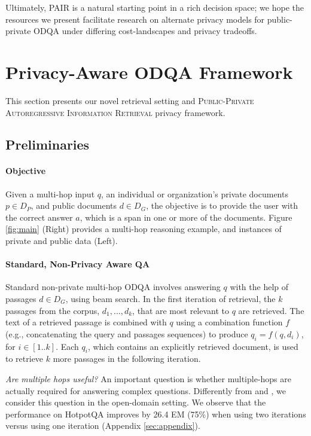 \documentclass{article}
\renewcommand\cite{\citep}	\newcommand\shortcite{\citeyearpar}\newcommand\newcite{\citet}
\newcommand{\problemlongname}{\textsc{Public-Private Autoregressive Information Retrieval}\xspace}
\newcommand{\problemshortname}{\textsc{PAIR}\xspace}
\begin{document}
Ultimately, \problemshortname is a natural starting point in a rich decision space; we hope the resources we present facilitate research on alternate privacy models for public-private ODQA under differing cost-landscapes and privacy tradeoffs. 
 
\section{Privacy-Aware ODQA Framework}
\label{sec:method}
This section presents our novel retrieval setting and \problemlongname privacy framework.

\subsection{Preliminaries}
\paragraph{Objective} Given a multi-hop input $q$, an individual or organization's private documents $p \in D_P$, and public documents $d \in D_G$, the objective is to provide the user with the correct answer $a$, which is a span in one or more of the documents. Figure \ref{fig:main} (Right) provides a multi-hop reasoning example, and instances of private and public data (Left).

\paragraph{Standard, Non-Privacy Aware QA} Standard non-private multi-hop ODQA involves answering $q$ with the help of passages $d \in D_G$, using beam search. In the first iteration of retrieval, the $k$ passages from the corpus, $d_1, ..., d_k$, that are most relevant to $q$ are retrieved. The text of a retrieved passage is combined with $q$ using a combination function $f$ (e.g., concatenating the query and passages sequences) to produce $q_i = f(q, d_i)$, for $i \in [1..k]$. Each $q_i$, which contains an explicitly retrieved document, is used to retrieve $k$ more passages in the following iteration. 


\textit{Are multiple hops useful?} An important question is whether multiple-hops are actually required for answering complex questions. Differently from \citet{min2019compmultihop} and \citet{chen2019multihopdesign}, we consider this question in the open-domain setting. We observe that the performance on HotpotQA \cite{yang2018hotpotqa} improves by 26.4 EM (75\%) when using two iterations versus using one iteration (Appendix \ref{sec:appendix}).
\end{document}
